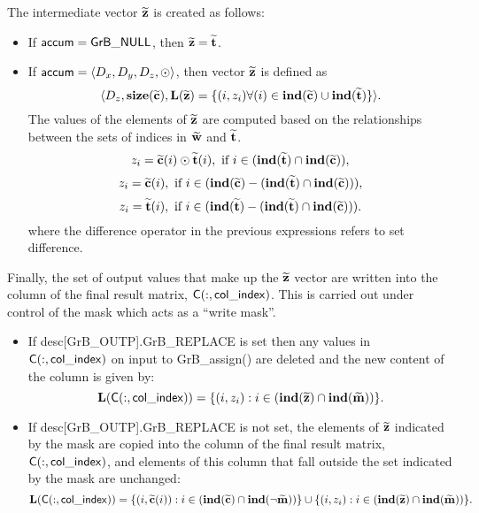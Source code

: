 The intermediate vector ${\bf \widetilde{z}}$ is created as follows:
\begin{itemize}
    \item If ${\sf accum} = {\sf GrB\_NULL}$, then 
    ${\bf \widetilde{z}} = {\bf \widetilde{t}}$.

    \item If ${\sf accum} = \langle D_x, D_y, D_z, \odot \rangle$, then vector 
    ${\bf \widetilde{z}}$ is defined as 
        \[ \langle D_z, \bold{size}({\bf \widetilde{c}}), 
        \bold{L}({\bf \widetilde{z}}) = \{(i,z_{i})  
        \forall (i) \in \bold{ind}({\bf \widetilde{c}}) \cup 
        \bold{ind}({\bf \widetilde{t}}) \} \rangle.\]
    The values of the elements of ${\bf \widetilde{z}}$ are computed based on the relationships between the sets of indices in ${\bf \widetilde{w}}$ and ${\bf \widetilde{t}}$.
\[
z_{i} = {\bf \widetilde{c}}(i) \odot {\bf \widetilde{t}}(i), \ \mbox{if}\  
i \in  (\bold{ind}({\bf \widetilde{t}}) \cap \bold{ind}({\bf \widetilde{c}})),
\]
\[
z_{i} = \vector{\widetilde{c}}(i), \ \mbox{if}\  i \in  (\bold{ind}(
\vector{\widetilde{c}}) - (\bold{ind}(\vector{\widetilde{t}}) \cap 
\bold{ind}(\vector{\widetilde{c}}))),
\]
\[
z_{i} = \vector{\widetilde{t}}(i), \ \mbox{if}\  i \in  (\bold{ind}(
\vector{\widetilde{t}}) - (\bold{ind}(\vector{\widetilde{t}}) \cap 
\bold{ind}(\vector{\widetilde{c}}))).
\]
where the difference operator in the previous expressions refers to set difference.
\end{itemize}

Finally, the set of output values that make up the ${\bf \widetilde{z}}$ 
vector are written into the column of the final result matrix, 
${\sf C}(:,{\sf col\_index})$.  This is carried out under control of the mask 
which acts as a ``write mask''.
\begin{itemize}
    \item If {\sf desc[GrB\_OUTP].GrB\_REPLACE} is set then any values in 
    ${\sf C}(:,{\sf col\_index})$ on input to {\sf GrB\_assign()} are deleted 
    and the new content of the column is given by:
    \[ 
    \bold{L}({\sf C}(:,{\sf col\_index})) = \{(i,z_{i}) : i \in 
    (\bold{ind}({\bf \widetilde{z}}) \cap \bold{ind}({\bf \widetilde{m}})) \}. 
    \]

    \item If {\sf desc[GrB\_OUTP].GrB\_REPLACE} is not set, the elements of 
    ${\bf \widetilde{z}}$ indicated by the mask are copied into the column 
    of the final result matrix, ${\sf C}(:,{\sf col\_index})$, and elements of 
    this column that fall outside the set indicated by the mask are unchanged:
    \[ 
    \bold{L}({\sf C}(:,{\sf col\_index})) =
    \{(i,{\bf \widetilde{c}}(i)) : i \in (\bold{ind}({\bf \widetilde{c}}) 
    \cap \bold{ind}(\neg {\bf \widetilde{m}})) \} \cup \{(i,z_{i}) : i \in 
    (\bold{ind}({\bf \widetilde{z}}) \cap \bold{ind}({\bf \widetilde{m}})) \}. 
    \]
\end{itemize}

